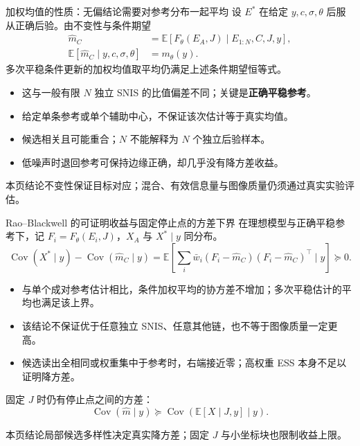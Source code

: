 \documentclass[10pt,aspectratio=169]{beamer}
\newcommand{\E}{\mathbb E}
\newcommand{\Cov}{\operatorname{Cov}}
\newcommand{\takeaway}[1]{\begin{exampleblock}{本页结论}\small #1\end{exampleblock}}
\begin{document}
\begin{frame}{加权均值的性质：无偏结论需要对参考分布一起平均}
\small
设 $E^*$ 在给定 $y,c,\sigma,\theta$ 后服从正确后验。由不变性与条件期望
\begin{align}
\widehat m_C&=\E[F_\theta(E_A,J)\mid E_{1:N},C,J,y],\\
\E[\widehat m_C\mid y,c,\sigma,\theta]&=m_\theta(y).
\end{align}
多次平稳条件更新的加权均值取平均仍满足上述条件期望恒等式。
\begin{itemize}\itemsep4pt
\item 这与一般有限 $N$ 独立 SNIS 的比值偏差不同；关键是\textbf{正确平稳参考}。
\item 给定单条参考或单个辅助中心，不保证该次估计等于真实均值。
\item 候选相关且可能重合；$N$ 不能解释为 $N$ 个独立后验样本。
\item 低噪声时退回参考可保持边缘正确，却几乎没有降方差收益。
\end{itemize}
\takeaway{不变性保证目标对应；混合、有效信息量与图像质量仍须通过真实实验评估。}
\end{frame}

\begin{frame}{Rao--Blackwell 的可证明收益与固定停止点的方差下界}
\small
在理想模型与正确平稳参考下，记 $F_i=F_\theta(E_i,J)$，$X_A$ 与 $X^*\mid y$ 同分布。
\begin{equation}
\Cov(X^*\mid y)-\Cov(\widehat m_C\mid y)
=\E\!\left[\sum_i\bar w_i(F_i-\widehat m_C)(F_i-\widehat m_C)^\top\mid y\right]\succeq0.
\end{equation}
\begin{itemize}\itemsep4pt
\item 与单个成对参考估计相比，条件加权平均的协方差不增加；多次平稳估计的平均也满足该上界。
\item 该结论不保证优于任意独立 SNIS、任意其他链，也不等于图像质量一定更高。
\item 候选读出全相同或权重集中于参考时，右端接近零；高权重 ESS 本身不足以证明降方差。
\end{itemize}
固定 $J$ 时仍有停止点之间的方差：
\begin{equation}
\Cov(\widehat m\mid y)\succeq
\Cov\!\left(\E[X\mid J,y]\mid y\right).
\end{equation}
\takeaway{局部候选多样性决定真实降方差；固定 $J$ 与小坐标块也限制收益上限。}
\end{frame}
\end{document}

